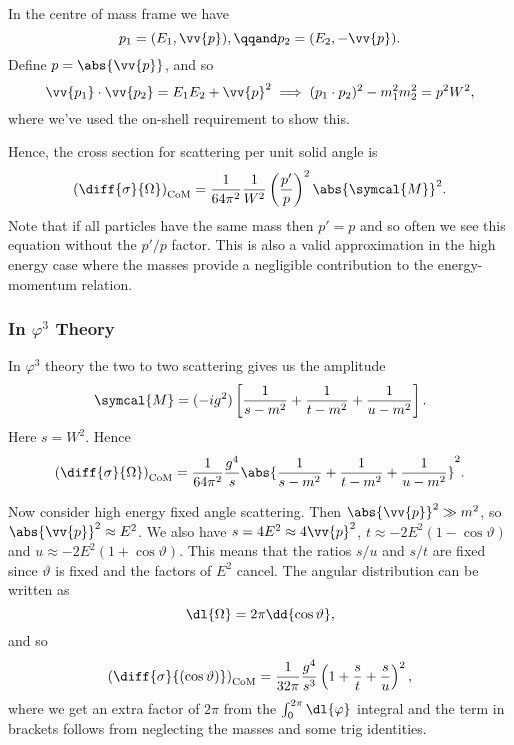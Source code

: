 \documentclass[fleqn]{NotesClass}
\newcommand{\amplitude}{\symcal{M}}
\begin{document}
    In the centre of mass frame we have
    \begin{equation}
        p_1 = (E_1, \vv{p}), \qqand p_2 = (E_2, -\vv{p}).
    \end{equation}
    Define \(p = \abs{\vv{p}}\), and so
    \begin{equation}
        \vv{p_1} \cdot \vv{p_2} = E_1E_2 + \vv{p}^2 \implies (p_1 \cdot p_2)^2 - m_1^2 m_2^2 = p^2W^2,
    \end{equation}
    where we've used the on-shell requirement to show this.
    
    Hence, the cross section for scattering per unit solid angle is
    \begin{equation}
        \left( \diff{\sigma}{\Omega} \right)_{\text{CoM}} = \frac{1}{64\pi^2} \frac{1}{W^2} \left( \frac{p'}{p} \right)^2 \abs{\amplitude}^2.
    \end{equation}
    Note that if all particles have the same mass then \(p' = p\) and so often we see this equation without the \(p'/p\) factor.
    This is also a valid approximation in the high energy case where the masses provide a negligible contribution to the energy-momentum relation.
    
    \subsubsection{In \texorpdfstring{\(\varphi^3\)}{Phi Cubed} Theory}
    In \(\varphi^3\) theory the two to two scattering gives us the amplitude
    \begin{equation}
        \amplitude = (-ig^2) \left[ \frac{1}{s - m^2} + \frac{1}{t - m^2} + \frac{1}{u - m^2} \right].
    \end{equation}
    Here \(s = W^2\).
    Hence
    \begin{equation}
        \left( \diff{\sigma}{\Omega} \right)_{\text{CoM}} = \frac{1}{64\pi^2} \frac{g^4}{s} \abs{\frac{1}{s - m^2} + \frac{1}{t - m^2} + \frac{1}{u - m^2}}^2.
    \end{equation}
    
    Now consider high energy fixed angle scattering.
    Then \(\abs{\vv{p}}^2 \gg m^2\), so \(\abs{\vv{p}}^2 \approx E^2\).
    We also have \(s = 4E^2 \approx 4\vv{p}^2\), \(t \approx -2E^2(1 - \cos\vartheta)\) and \(u \approx -2E^2(1 + \cos\vartheta)\).
    This means that the ratios \(s/u\) and \(s/t\) are fixed since \(\vartheta\) is fixed and the factors of \(E^2\) cancel.
    The angular distribution can be written as
    \begin{equation}
        \dl{\Omega} = 2\pi \dd{\cos \vartheta},
    \end{equation}
    and so
    \begin{equation}
        \left( \diff{\sigma}{(\cos \vartheta)} \right)_{\text{CoM}} = \frac{1}{32\pi} \frac{g^4}{s^3}\left( 1 + \frac{s}{t} + \frac{s}{u} \right)^2,
    \end{equation}
    where we get an extra factor of \(2\pi\) from the \(\int_0^{2\pi}\dl{\varphi}\) integral and the term in brackets follows from neglecting the masses and some trig identities.
    
\end{document}

